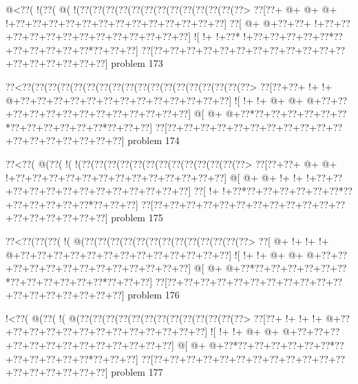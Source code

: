 \vbox{\vbox{\goo
\- @<\0??(\- !(\0??(\- @(\- !(\0??(\0??(\0??(\0??(\0??(\0??(\0??(\0??(\0??(\0??(\0??(\0??(\0??>
\0??[\0??+\- @+\- @+\- @+\- !+\0??+\0??+\0??+\0??+\0??+\0??+\0??+\0??+\0??+\0??+\0??+\0??+\0??]
\0??[\- @+\- @+\0??+\0??+\- !+\0??+\0??+\0??+\0??+\0??+\0??+\0??+\0??+\0??+\0??+\0??+\0??+\0??]
\- ![\- !+\- !+\0??*\- !+\0??+\0??+\0??+\0??+\0??*\0??+\0??+\0??+\0??+\0??+\0??*\0??+\0??+\0??]
\0??[\0??+\0??+\0??+\0??+\0??+\0??+\0??+\0??+\0??+\0??+\0??+\0??+\0??+\0??+\0??+\0??+\0??+\0??]
}
\hfil problem 173\hfil\break
}



\vbox{\vbox{\goo
\0??<\0??(\0??(\0??(\0??(\0??(\0??(\0??(\0??(\0??(\0??(\0??(\0??(\0??(\0??(\0??(\0??(\0??(\0??>
\0??[\0??+\0??+\- !+\- !+\- @+\0??+\0??+\0??+\0??+\0??+\0??+\0??+\0??+\0??+\0??+\0??+\0??+\0??]
\- ![\- !+\- !+\- @+\- @+\- @+\0??+\0??+\0??+\0??+\0??+\0??+\0??+\0??+\0??+\0??+\0??+\0??+\0??]
\- @[\- @+\- @+\0??*\0??+\0??+\0??+\0??+\0??+\0??*\0??+\0??+\0??+\0??+\0??+\0??*\0??+\0??+\0??]
\0??[\0??+\0??+\0??+\0??+\0??+\0??+\0??+\0??+\0??+\0??+\0??+\0??+\0??+\0??+\0??+\0??+\0??+\0??]
}
\hfil problem 174\hfil\break
}



\vbox{\vbox{\goo
\0??<\0??(\- @(\0??(\- !(\- !(\0??(\0??(\0??(\0??(\0??(\0??(\0??(\0??(\0??(\0??(\0??(\0??(\0??>
\0??[\0??+\0??+\- @+\- @+\- !+\0??+\0??+\0??+\0??+\0??+\0??+\0??+\0??+\0??+\0??+\0??+\0??+\0??]
\- @[\- @+\- @+\- !+\- !+\- !+\0??+\0??+\0??+\0??+\0??+\0??+\0??+\0??+\0??+\0??+\0??+\0??+\0??]
\0??[\- !+\- !+\0??*\0??+\0??+\0??+\0??+\0??+\0??*\0??+\0??+\0??+\0??+\0??+\0??*\0??+\0??+\0??]
\0??[\0??+\0??+\0??+\0??+\0??+\0??+\0??+\0??+\0??+\0??+\0??+\0??+\0??+\0??+\0??+\0??+\0??+\0??]
}
\hfil problem 175\hfil\break
}



\vbox{\vbox{\goo
\0??<\0??(\0??(\0??(\- !(\- @(\0??(\0??(\0??(\0??(\0??(\0??(\0??(\0??(\0??(\0??(\0??(\0??(\0??>
\0??[\- @+\- !+\- !+\- !+\- @+\0??+\0??+\0??+\0??+\0??+\0??+\0??+\0??+\0??+\0??+\0??+\0??+\0??]
\- ![\- !+\- !+\- @+\- @+\- @+\0??+\0??+\0??+\0??+\0??+\0??+\0??+\0??+\0??+\0??+\0??+\0??+\0??]
\- @[\- @+\- @+\0??*\0??+\0??+\0??+\0??+\0??+\0??*\0??+\0??+\0??+\0??+\0??+\0??*\0??+\0??+\0??]
\0??[\0??+\0??+\0??+\0??+\0??+\0??+\0??+\0??+\0??+\0??+\0??+\0??+\0??+\0??+\0??+\0??+\0??+\0??]
}
\hfil problem 176\hfil\break
}



\vbox{\vbox{\goo
\- !<\0??(\- @(\0??(\- !(\- @(\0??(\0??(\0??(\0??(\0??(\0??(\0??(\0??(\0??(\0??(\0??(\0??(\0??>
\0??[\0??+\- !+\- !+\- !+\- @+\0??+\0??+\0??+\0??+\0??+\0??+\0??+\0??+\0??+\0??+\0??+\0??+\0??]
\- ![\- !+\- !+\- @+\- @+\- @+\0??+\0??+\0??+\0??+\0??+\0??+\0??+\0??+\0??+\0??+\0??+\0??+\0??]
\- @[\- @+\- @+\0??*\0??+\0??+\0??+\0??+\0??+\0??*\0??+\0??+\0??+\0??+\0??+\0??*\0??+\0??+\0??]
\0??[\0??+\0??+\0??+\0??+\0??+\0??+\0??+\0??+\0??+\0??+\0??+\0??+\0??+\0??+\0??+\0??+\0??+\0??]
}
\hfil problem 177\hfil\break
}



